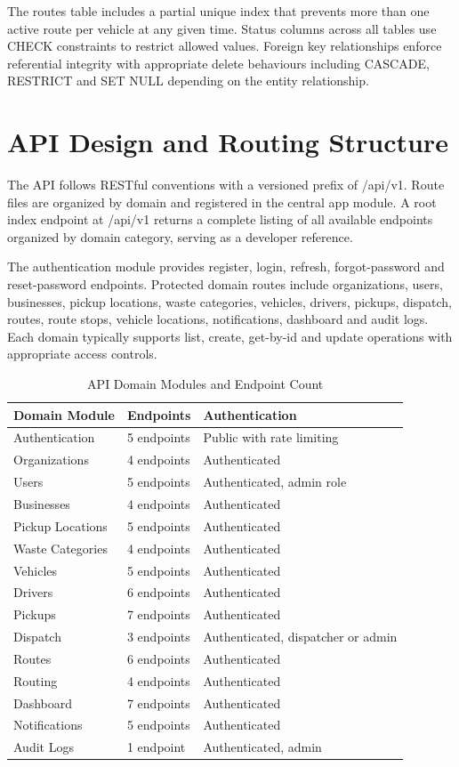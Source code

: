 \documentclass[12pt,a4paper]{report}
\begin{document}
The routes table includes a partial unique index that prevents more than one active route per vehicle at any given time. Status columns across all tables use CHECK constraints to restrict allowed values. Foreign key relationships enforce referential integrity with appropriate delete behaviours including CASCADE, RESTRICT and SET NULL depending on the entity relationship.

\section{API Design and Routing Structure}
The API follows RESTful conventions with a versioned prefix of /api/v1. Route files are organized by domain and registered in the central app module. A root index endpoint at /api/v1 returns a complete listing of all available endpoints organized by domain category, serving as a developer reference.

The authentication module provides register, login, refresh, forgot-password and reset-password endpoints. Protected domain routes include organizations, users, businesses, pickup locations, waste categories, vehicles, drivers, pickups, dispatch, routes, route stops, vehicle locations, notifications, dashboard and audit logs. Each domain typically supports list, create, get-by-id and update operations with appropriate access controls.

\begin{table}[h!]
\centering
\caption{API Domain Modules and Endpoint Count}
\begin{tabular}{|p{1.8in}|p{1.5in}|p{2.0in}|}
\hline
\textbf{Domain Module} & \textbf{Endpoints} & \textbf{Authentication}\\\hline
Authentication & 5 endpoints & Public with rate limiting\\\hline
Organizations & 4 endpoints & Authenticated\\\hline
Users & 5 endpoints & Authenticated, admin role\\\hline
Businesses & 4 endpoints & Authenticated\\\hline
Pickup Locations & 5 endpoints & Authenticated\\\hline
Waste Categories & 4 endpoints & Authenticated\\\hline
Vehicles & 5 endpoints & Authenticated\\\hline
Drivers & 6 endpoints & Authenticated\\\hline
Pickups & 7 endpoints & Authenticated\\\hline
Dispatch & 3 endpoints & Authenticated, dispatcher or admin\\\hline
Routes & 6 endpoints & Authenticated\\\hline
Routing & 4 endpoints & Authenticated\\\hline
Dashboard & 7 endpoints & Authenticated\\\hline
Notifications & 5 endpoints & Authenticated\\\hline
Audit Logs & 1 endpoint & Authenticated, admin\\\hline
\end{tabular}
\end{table}
\end{document}

